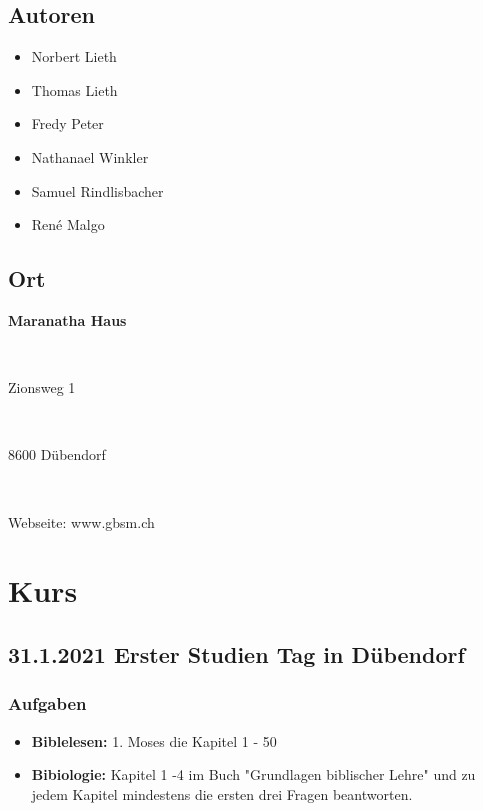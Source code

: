\subsection{Autoren}
\begin{itemize}
    \item Norbert Lieth
    \item Thomas Lieth
    \item Fredy Peter
    \item Nathanael Winkler
    \item Samuel Rindlisbacher
    \item René Malgo
\end{itemize}
\subsection{Ort}
\parbox{3.5in}{\textbf{Maranatha Haus}}\\
\parbox{3.5in}{Zionsweg 1} \\
\parbox{3.5in}{8600 Dübendorf} \\
\parbox{3.5in}{Webseite: www.gbsm.ch}
\newpage
\section{Kurs}
\subsection{31.1.2021 Erster Studien Tag in Dübendorf}
\subsubsection{Aufgaben}
\begin{itemize}
    \item \textbf{Biblelesen:} 1. Moses die Kapitel 1 - 50
    \item \textbf{Bibiologie:} Kapitel 1 -4 im Buch "Grundlagen biblischer Lehre" 
    \cite{bibli:1} und zu jedem Kapitel mindestens die ersten drei Fragen beantworten. 
\end{itemize}
